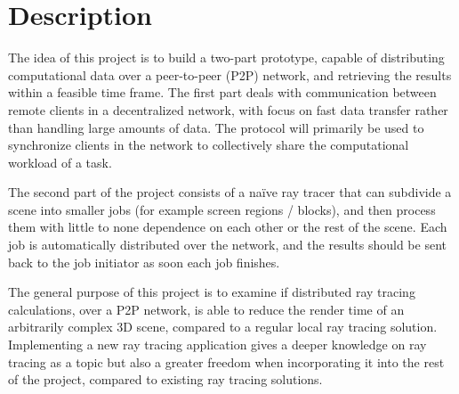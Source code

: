 \chapter{Description}


The idea of this project is to build a two-part prototype, capable of distributing computational data over a peer-to-peer (P2P) network, and retrieving the results within a feasible time frame. The first part deals with communication between remote clients in a decentralized network, with focus on fast data transfer rather than handling large amounts of data. The protocol will primarily be used to synchronize clients in the network to collectively share the computational workload of a task. 

The second part of the project consists of a naïve ray tracer that can subdivide a scene into smaller jobs (for example screen regions / blocks), and then process them with little to none dependence on each other or the rest of the scene. Each job is automatically distributed over the network, and the results should be sent back to the job initiator as soon each job finishes.

The general purpose of this project is to examine if distributed ray tracing calculations, over a P2P network, is able to reduce the render time of an arbitrarily complex 3D scene, compared to a regular local ray tracing solution. Implementing a new ray tracing application gives a deeper knowledge on ray tracing as a topic but also a greater freedom when incorporating it into the rest of the project, compared to existing ray tracing solutions.

